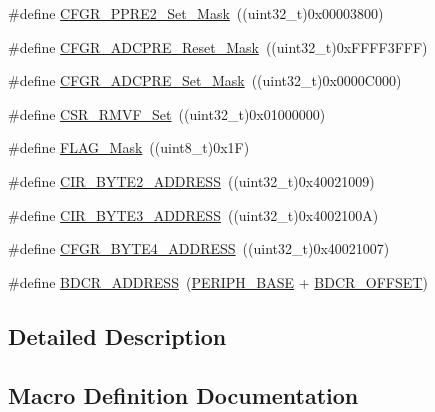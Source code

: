 \begin{DoxyCompactItemize}
\item 
\#define \hyperlink{group___r_c_c___private___defines_ga63883951c986cf6dc1d6a8775f821af7}{C\+F\+G\+R\+\_\+\+P\+P\+R\+E2\+\_\+\+Set\+\_\+\+Mask}~((uint32\+\_\+t)0x00003800)
\item 
\#define \hyperlink{group___r_c_c___private___defines_ga12eb3f1b37b9101bf3810374bad68703}{C\+F\+G\+R\+\_\+\+A\+D\+C\+P\+R\+E\+\_\+\+Reset\+\_\+\+Mask}~((uint32\+\_\+t)0x\+F\+F\+F\+F3\+F\+F\+F)
\item 
\#define \hyperlink{group___r_c_c___private___defines_gaead9b35ba6e98274613c28d24bd228cc}{C\+F\+G\+R\+\_\+\+A\+D\+C\+P\+R\+E\+\_\+\+Set\+\_\+\+Mask}~((uint32\+\_\+t)0x0000\+C000)
\item 
\#define \hyperlink{group___r_c_c___private___defines_ga415e9d29487f0ef4101a9c6e4f20151f}{C\+S\+R\+\_\+\+R\+M\+V\+F\+\_\+\+Set}~((uint32\+\_\+t)0x01000000)
\item 
\#define \hyperlink{group___r_c_c___private___defines_ga2be62bf481cd44de9ab604efe5595ff6}{F\+L\+A\+G\+\_\+\+Mask}~((uint8\+\_\+t)0x1\+F)
\item 
\#define \hyperlink{group___r_c_c___private___defines_gaab58c3f3f81bf1ab9a14cf3fececd8c4}{C\+I\+R\+\_\+\+B\+Y\+T\+E2\+\_\+\+A\+D\+D\+R\+E\+SS}~((uint32\+\_\+t)0x40021009)
\item 
\#define \hyperlink{group___r_c_c___private___defines_ga43f47430582c9575970901533e525bb5}{C\+I\+R\+\_\+\+B\+Y\+T\+E3\+\_\+\+A\+D\+D\+R\+E\+SS}~((uint32\+\_\+t)0x4002100\+A)
\item 
\#define \hyperlink{group___r_c_c___private___defines_ga5fea86b59ec4be059d922db57cca3b3f}{C\+F\+G\+R\+\_\+\+B\+Y\+T\+E4\+\_\+\+A\+D\+D\+R\+E\+SS}~((uint32\+\_\+t)0x40021007)
\item 
\#define \hyperlink{group___r_c_c___private___defines_ga40b5a415d697b6af7babd8a208c92435}{B\+D\+C\+R\+\_\+\+A\+D\+D\+R\+E\+SS}~(\hyperlink{group___peripheral__memory__map_ga9171f49478fa86d932f89e78e73b88b0}{P\+E\+R\+I\+P\+H\+\_\+\+B\+A\+SE} + \hyperlink{group___r_c_c___private___defines_ga5f8a0c3cb5f5c835bf7eef09515138ad}{B\+D\+C\+R\+\_\+\+O\+F\+F\+S\+ET})
\end{DoxyCompactItemize}


\subsection{Detailed Description}


\subsection{Macro Definition Documentation}
\mbox{\label{group___r_c_c___private___defines_ga40b5a415d697b6af7babd8a208c92435}} 
